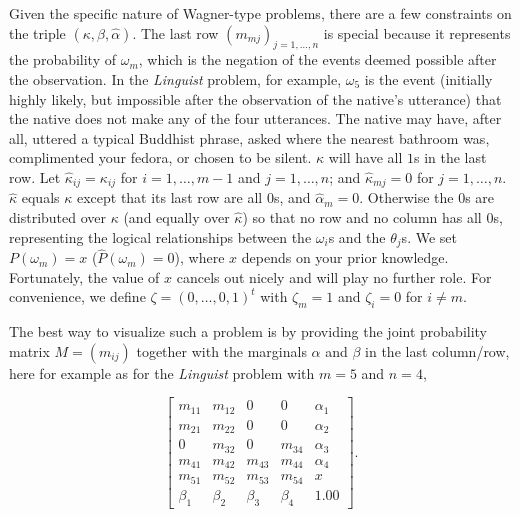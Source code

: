 \documentclass[entropy,article,submit,oneauthor,pdftex,12pt,a4paper]{mdpi}
\newcommand{\intercal}{t}
\begin{document}
Given the specific nature of Wagner-type problems, there are a few
constraints on the triple $(\kappa,\beta,\hat{\alpha})$. The last row
$(m_{mj})_{j=1,\ldots,n}$ is special because it represents the
probability of $\omega_{m}$, which is the negation of the events
deemed possible after the observation. In the \emph{Linguist} problem,
for example, $\omega_{5}$ is the event (initially highly likely, but
impossible after the observation of the native's utterance) that the
native does not make any of the four utterances. The native may have,
after all, uttered a typical Buddhist phrase, asked where the nearest
bathroom was, complimented your fedora, or chosen to be silent.
$\kappa$ will have all $1$s in the last row. Let
$\hat{\kappa}_{ij}=\kappa_{ij}$ for $i=1,\ldots,m-1$ and
$j=1,\ldots,n$; and $\hat{\kappa}_{mj}=0$ for $j=1,\ldots,n$.
$\hat{\kappa}$ equals $\kappa$ except that its last row are all $0$s,
and $\hat{\alpha}_{m}=0$. Otherwise the $0$s are distributed over
$\kappa$ (and equally over $\hat{\kappa}$) so that no row and no
column has all $0$s, representing the logical relationships between
the $\omega_{i}$s and the $\theta_{j}$s. We set $P(\omega_{m})=x$
($\hat{P}(\omega_{m})=0$), where $x$ depends on your prior knowledge.
Fortunately, the value of $x$ cancels out nicely and will play no
further role. For convenience, we define
$\zeta=(0,\ldots,0,1)^{\intercal}$ with $\zeta_{m}=1$ and
$\zeta_{i}=0$ for $i\neq{}m$.

The best way to visualize such a problem is by providing the joint
probability matrix $M=(m_{ij})$ together with the marginals $\alpha$
and $\beta$ in the last column/row, here for example as for the
\emph{Linguist} problem with $m=5$ and $n=4$,

\begin{equation}
  \label{eq:m3}
      \left[
      \begin{array}{ccccc}
        m_{11} & m_{12} & 0 & 0 & \alpha_{1} \\
        m_{21} & m_{22} & 0 & 0 & \alpha_{2} \\
        0 & m_{32} & 0 & m_{34} & \alpha_{3} \\
        m_{41} & m_{42} & m_{43} & m_{44} & \alpha_{4} \\
        m_{51} & m_{52} & m_{53} & m_{54} & x \\
        \beta_{1} & \beta_{2} & \beta_{3} & \beta_{4} & 1.00
      \end{array}
\right].
\end{equation}
\end{document}
